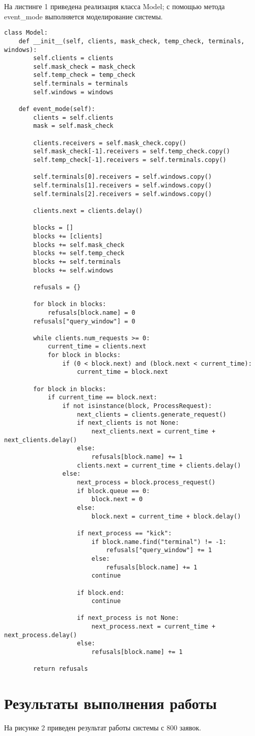 На листинге 1 приведена реализация класса Model; с помощью метода event\_mode выполняется моделирование системы.
\begin{lstlisting}[label=CodeStand,caption=Класс Model]
class Model:
	def __init__(self, clients, mask_check, temp_check, terminals, windows):
		self.clients = clients
		self.mask_check = mask_check
		self.temp_check = temp_check
		self.terminals = terminals
		self.windows = windows

	def event_mode(self):
		clients = self.clients
		mask = self.mask_check
		
		clients.receivers = self.mask_check.copy()
		self.mask_check[-1].receivers = self.temp_check.copy()
		self.temp_check[-1].receivers = self.terminals.copy()
		
		self.terminals[0].receivers = self.windows.copy()
		self.terminals[1].receivers = self.windows.copy()
		self.terminals[2].receivers = self.windows.copy()
		
		clients.next = clients.delay()
	
		blocks = []
		blocks += [clients]
		blocks += self.mask_check
		blocks += self.temp_check
		blocks += self.terminals
		blocks += self.windows
		
		refusals = {}
		
		for block in blocks:
			refusals[block.name] = 0
		refusals["query_window"] = 0
	
		while clients.num_requests >= 0:
			current_time = clients.next
			for block in blocks:
				if (0 < block.next) and (block.next < current_time):
					current_time = block.next
	
		for block in blocks:
			if current_time == block.next:
				if not isinstance(block, ProcessRequest):
					next_clients = clients.generate_request()
					if next_clients is not None:
						next_clients.next = current_time + next_clients.delay()
					else:
						refusals[block.name] += 1
					clients.next = current_time + clients.delay()
				else:
					next_process = block.process_request()
					if block.queue == 0:
						block.next = 0
					else:
						block.next = current_time + block.delay()
		
					if next_process == "kick":
						if block.name.find("terminal") != -1:
							refusals["query_window"] += 1
						else:
							refusals[block.name] += 1
						continue
		
					if block.end:
						continue
		
					if next_process is not None:
						next_process.next = current_time + next_process.delay()
					else:
						refusals[block.name] += 1
		
		return refusals
\end{lstlisting}



\section*{Результаты выполнения работы}

На рисунке 2 приведен результат работы системы с 800 заявок.







